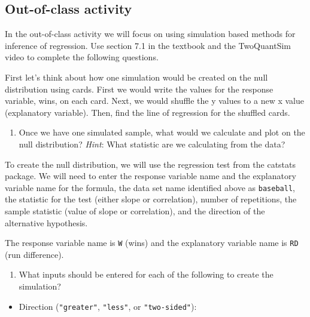 \documentclass[
]{report}
\providecommand{\tightlist}{%
  \setlength{\itemsep}{0pt}\setlength{\parskip}{0pt}}
\begin{document}
\vspace{1in}

\hypertarget{out-of-class-activity-11}{%
\subsection{Out-of-class activity}\label{out-of-class-activity-11}}

In the out-of-class activity we will focus on using simulation based methods for inference of regression. Use section 7.1 in the textbook and the TwoQuantSim video to complete the following questions.

First let's think about how one simulation would be created on the null distribution using cards. First we would write the values for the response variable, wins, on each card. Next, we would shuffle the y values to a new x value (explanatory variable). Then, find the line of regression for the shuffled cards.

\begin{enumerate}
\def\labelenumi{\arabic{enumi}.}
\tightlist
\item
  Once we have one simulated sample, what would we calculate and plot on the null distribution? \emph{Hint}: What statistic are we calculating from the data?
\end{enumerate}

\vspace{1in}

To create the null distribution, we will use the regression test from the catstats package. We will need to enter the response variable name and the explanatory variable name for the formula, the data set name identified above as \texttt{baseball}, the statistic for the test (either slope or correlation), number of repetitions, the sample statistic (value of slope or correlation), and the direction of the alternative hypothesis.

The response variable name is \texttt{W} (wins) and the explanatory variable name is \texttt{RD} (run difference).

\begin{enumerate}
\def\labelenumi{\arabic{enumi}.}
\setcounter{enumi}{1}
\tightlist
\item
  What inputs should be entered for each of the following to create the simulation?
\end{enumerate}

\vspace{.5 mm}

\begin{itemize}
\tightlist
\item
  Direction (\texttt{"greater"}, \texttt{"less"}, or \texttt{"two-sided"}):
\end{itemize}
\end{document}
